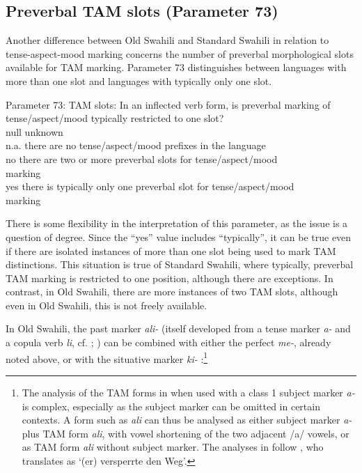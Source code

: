 \documentclass[output=paper]{langscibook}
\begin{document}
\subsection{Preverbal TAM slots (Parameter 73)}\label{sec:marten:3.7}

Another difference between Old Swahili and Standard Swahili in relation to tense-aspect-mood marking concerns the number of preverbal morphological slots available for TAM marking. Parameter 73 distinguishes between languages with more than one slot and languages with typically only one slot. 

\ea\label{ex:marten:40} Parameter 73: TAM slots: In an inflected verb form, is preverbal marking of tense/aspect/mood typically restricted to one slot?\\
\gllllll null\hspace{1ex}    unknown\\
n.a.     {there are no tense/aspect/mood prefixes in the language}\\
no      {there are two or more preverbal slots for tense/aspect/mood}\\
{} marking\\
yes     {there is typically only one preverbal slot for tense/aspect/mood}\\
{} marking\\
\z

There is some flexibility in the interpretation of this parameter, as the issue is a question of degree. Since the ``yes'' value includes ``typically'', it can be true even if there are isolated instances of more than one slot being used to mark TAM distinctions. This situation is true of Standard Swahili, where typically, preverbal TAM marking is restricted to one position, although there are exceptions. In contrast, in Old Swahili, there are more instances of two TAM slots, although even in Old Swahili, this is not freely available. 

  In Old Swahili, the past marker \textit{{}ali-} (itself developed from a tense marker \textit{{}a-} and a copula verb \textit{li}, cf. \citealt[412, 443, 455, 502, 505]{NurseHinnebusch1993}; \citealt[83]{Nurse2008}) can be combined with either the perfect \textit{{}me-}, already noted above, or with the situative marker \textit{{}ki-} \citep[219--220]{Miehe1979}:\footnote{The analysis of the TAM forms in  when used with a class 1 subject marker \textit{a-} is complex, especially as the subject marker can be omitted in certain contexts. A form such as \textit{ali} can thus be analysed as either subject marker \textit{a-} plus TAM form \textit{ali}, with vowel shortening of the two adjacent /a/ vowels, or as TAM form \textit{ali} without subject marker. The analyses in  follow \citet[219]{Miehe1979}, who translates  as ‘(er) versperrte den Weg’.} 
\end{document}
